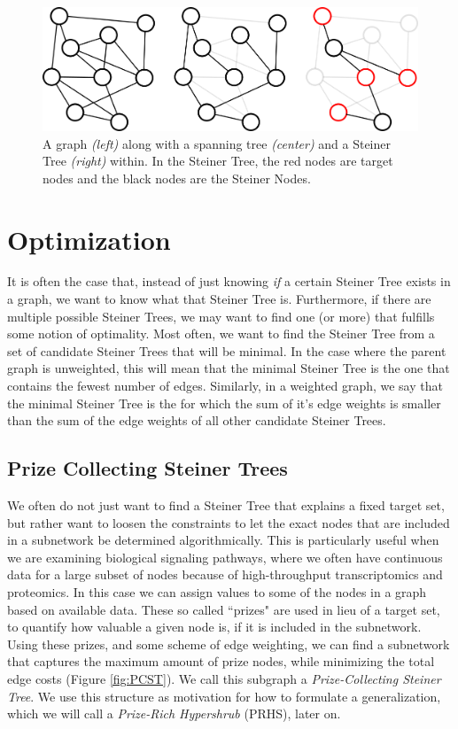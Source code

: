 \documentclass[12pt,twoside]{reedthesis}
\theoremstyle{definition}
\begin{document}
   \begin{figure}[!h]
     \begin{center}
       \includegraphics[width=\textwidth]{graph1}
     \caption[Spanning and Steiner Trees.]{A graph \textit{(left)} along with a spanning tree \textit{(center)} and a Steiner Tree \textit{(right)} within. In the Steiner Tree, the red nodes are target nodes and the black nodes are the Steiner Nodes.}
     \label{fig:graph1}
     \end{center}
   \end{figure}

 \section{Optimization}

 It is often the case that, instead of just knowing \emph{if} a certain Steiner Tree exists in a graph, we want to know what that Steiner Tree is. Furthermore, if there are multiple possible Steiner Trees, we may want to find one (or more) that fulfills some notion of optimality. Most often, we want to find the Steiner Tree from a set of candidate Steiner Trees that will be minimal. In the case where the parent graph is unweighted, this will mean that the minimal Steiner Tree is the one that contains the fewest number of edges. Similarly, in a weighted graph, we say that the minimal Steiner Tree is the for which the sum of it's edge weights is smaller than the sum of the edge weights of all other candidate Steiner Trees.

  \subsection{Prize Collecting Steiner Trees}
  We often do not just want to find a Steiner Tree that explains a fixed target set, but rather want to loosen the constraints to let the exact nodes that are included in a subnetwork be determined algorithmically. This is particularly useful when we are examining biological signaling pathways, where we often have continuous data for a large subset of nodes because of high-throughput transcriptomics and proteomics. In this case we can assign values to some of the nodes in a graph based on available data. These so called ``prizes" are used in lieu of a target set, to quantify how valuable a given node is, if it is included in the subnetwork. Using these prizes, and some scheme of edge weighting, we can find a subnetwork that captures the maximum amount of prize nodes, while minimizing the total edge costs (Figure \ref{fig:PCST}). We call this subgraph a \textit{Prize-Collecting Steiner Tree}. We use this structure as motivation for how to formulate a generalization, which we will call a \textit{Prize-Rich Hypershrub} (PRHS), later on.
\end{document}
